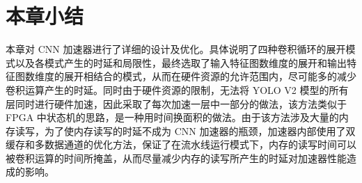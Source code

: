 \section{本章小结}

本章对 CNN 加速器进行了详细的设计及优化。具体说明了四种卷积循环的展开模式以及各模式产生的时延和局限性，最终选取了输入特征图数维度的展开和输出特征图数维度的展开相结合的模式，从而在硬件资源的允许范围内，尽可能多的减少卷积运算产生的时延。同时由于硬件资源的限制，无法将 YOLO V2 模型的所有层同时进行硬件加速，因此采取了每次加速一层中一部分的做法，该方法类似于 FPGA 中状态机的思路，是一种用时间换面积的做法。由于该方法涉及大量的内存读写，为了使内存读写的时延不成为 CNN 加速器的瓶颈，加速器内部使用了双缓存和多数据通道的优化方法，保证了在流水线运行模式下，内存的读写时间可以被卷积运算的时间所掩盖，从而尽量减少内存的读写所产生的时延对加速器性能造成的影响。